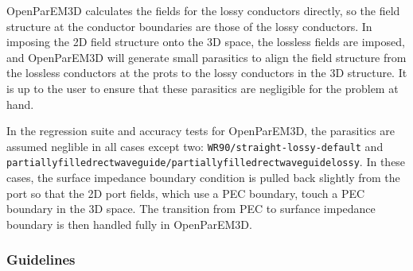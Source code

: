\documentclass[titlepage]{article}
\renewcommand\_{\textunderscore\linebreak[1]}
\begin{document}
OpenParEM3D calculates the fields for the lossy conductors directly, so the field structure at the conductor boundaries are those of the lossy conductors.  In imposing the 2D field structure onto the 3D space, the lossless fields are imposed, and OpenParEM3D will generate small parasitics to align the field structure from the lossless conductors at the prots to the lossy conductors in the 3D structure.  It is up to the user to ensure that these parasitics are negligible for the problem at hand.

In the regression suite and accuracy tests for OpenParEM3D, the parasitics are assumed neglible in all cases except two: \texttt{WR90/straight-lossy-default} and \texttt{partially\_filled\_rect\_waveguide/partially\_filled\_rect\_waveguide\_lossy}.  In these cases, the surface impedance boundary condition is pulled back slightly from the port so that the 2D port fields, which use a PEC boundary, touch a PEC boundary in the 3D space.  The transition from PEC to surfance impedance boundary is then handled fully in OpenParEM3D.

\subsubsection{Guidelines}
\end{document}

